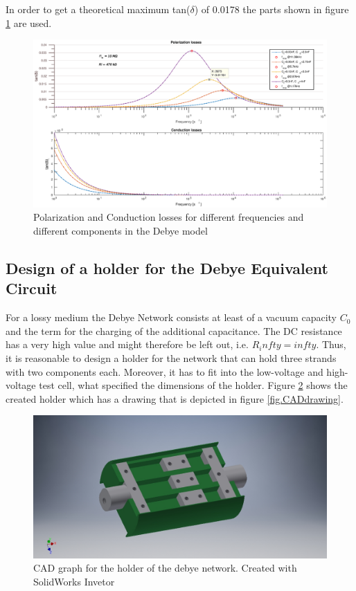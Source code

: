 In order to get a theoretical maximum tan($\delta$) of 0.0178 the parts shown in figure \ref{fig.debye-modell} are used. 
\begin{figure}
	\includegraphics[width=\textwidth]{figures/Method/Dielectric_loss/polarizationmultiple.eps}	

	\caption{Polarization and Conduction losses for different frequencies and different components in the Debye model }	

	\label{fig.debye-modell}
\end{figure}

\subsection{Design of a holder for the Debye Equivalent Circuit}
For a lossy medium the Debye Network consists at least of a vacuum capacity $C_0$ and the term for the charging of the additional capacitance. The DC resistance has a very high value and might therefore be left out, i.e. $R_infty=infty$. Thus, it is reasonable to design a holder for the network that can hold three strands with two components each. Moreover, it has to fit into the low-voltage and high-voltage test cell, what specified the dimensions of the holder.  
Figure \ref{fig.CADgraph} shows the created holder which has a drawing that is depicted in figure \ref{fig.CADdrawing}.

\begin{figure}
\includegraphics[width=\textwidth]{figures/Method/CAD_MODEL/Gesamtanordnung.jpg}
\caption{CAD graph for the holder of the debye network. Created with SolidWorks Invetor}
\label{fig.CADgraph}
\end{figure}
\newpage

